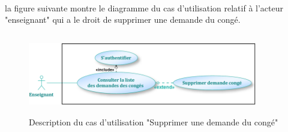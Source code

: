 \documentclass[12 pt ]{report}
\begin{document}
 \\
la figure suivante montre le diagramme du cas d'utilisation relatif à l'acteur "enseignant" qui a le droit de supprimer une demande du congé.
\begin{figure}[h]
\begin{center}
\includegraphics[width= 10cm , height = 3.5cm]{e42.png}
\caption{Description du cas d'utilisation "Supprimer une demande du congé"}
\end{center}
\end{figure}
\newpage
\end{document}
